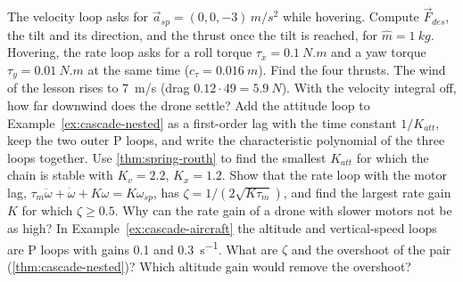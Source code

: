 \begin{exercises}
\exercise[1] The velocity loop asks for $\vec a_{sp} = (0, 0, -3)\,\si{m/s^2}$ while hovering. Compute $\vec F_{des}$, the tilt and its direction, and the thrust once the tilt is reached, for $\hat m = \SI{1}{kg}$.
\exercise[1] Hovering, the rate loop asks for a roll torque $\tau_x = \SI{0.1}{N.m}$ and a yaw torque $\tau_y = \SI{0.01}{N.m}$ at the same time ($c_\tau = \SI{0.016}{m}$). Find the four thrusts.
\exercise[1] The wind of the lesson rises to \SI{7}{m/s} (drag $0.12 \cdot 49 = \SI{5.9}{N}$). With the velocity integral off, how far downwind does the drone settle?
\exercise[2] Add the attitude loop to Example~\ref{ex:cascade-nested} as a first-order lag with the time constant $1/K_{att}$, keep the two outer P loops, and write the characteristic polynomial of the three loops together. Use \cref{thm:spring-routh} to find the smallest $K_{att}$ for which the chain is stable with $K_v = 2.2$, $K_x = 1.2$.
\exercise[2] Show that the rate loop with the motor lag, $\tau_m\ddot\omega + \dot\omega + K\omega = K\omega_{sp}$, has $\zeta = 1/(2\sqrt{K\tau_m})$, and find the largest rate gain $K$ for which $\zeta \ge 0.5$. Why can the rate gain of a drone with slower motors not be as high?
\exercise[2] In Example~\ref{ex:cascade-aircraft} the altitude and vertical-speed loops are P loops with gains 0.1 and \SI{0.3}{s^{-1}}. What are $\zeta$ and the overshoot of the pair (\cref{thm:cascade-nested})? Which altitude gain would remove the overshoot?

\end{exercises}
